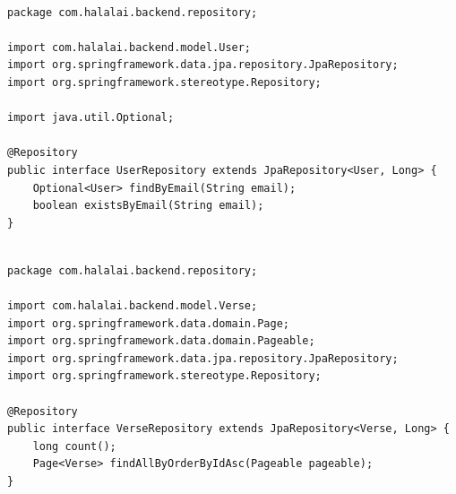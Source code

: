 \begin{lstlisting}[basicstyle=\tiny\ttfamily,breaklines=true]

package com.halalai.backend.repository;

import com.halalai.backend.model.User;
import org.springframework.data.jpa.repository.JpaRepository;
import org.springframework.stereotype.Repository;

import java.util.Optional;

@Repository
public interface UserRepository extends JpaRepository<User, Long> {
    Optional<User> findByEmail(String email);
    boolean existsByEmail(String email);
}
\end{lstlisting}

\begin{lstlisting}[basicstyle=\tiny\ttfamily,breaklines=true]

package com.halalai.backend.repository;

import com.halalai.backend.model.Verse;
import org.springframework.data.domain.Page;
import org.springframework.data.domain.Pageable;
import org.springframework.data.jpa.repository.JpaRepository;
import org.springframework.stereotype.Repository;

@Repository
public interface VerseRepository extends JpaRepository<Verse, Long> {
    long count();
    Page<Verse> findAllByOrderByIdAsc(Pageable pageable);
}
\end{lstlisting}

